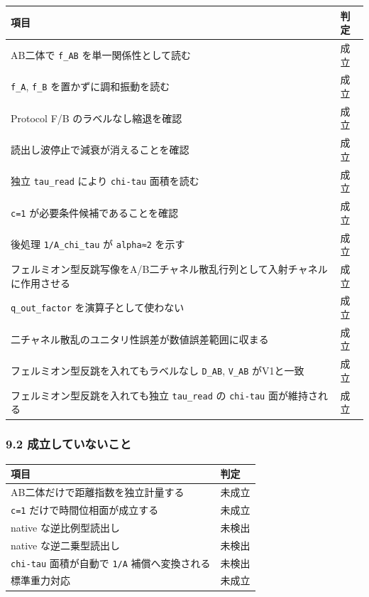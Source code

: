 \documentclass[
]{article}
\newcounter{none} %
\begin{document}
{\def\LTcaptype{none} %
\begin{longtable}[]{@{}
  >{\raggedright\arraybackslash}p{}
  >{\raggedright\arraybackslash}p{}@{}}
\toprule\noalign{}
\begin{minipage}[b]{\linewidth}\raggedright
項目
\end{minipage} & \begin{minipage}[b]{\linewidth}\raggedright
判定
\end{minipage} \\
\midrule\noalign{}
\endhead
\bottomrule\noalign{}
\endlastfoot
AB二体で \texttt{f\_AB} を単一関係性として読む & 成立 \\
\texttt{f\_A}, \texttt{f\_B} を置かずに調和振動を読む & 成立 \\
Protocol F/B のラベルなし縮退を確認 & 成立 \\
読出し波停止で減衰が消えることを確認 & 成立 \\
独立 \texttt{tau\_read} により \texttt{chi-tau} 面積を読む & 成立 \\
\texttt{c=1} が必要条件候補であることを確認 & 成立 \\
後処理 \texttt{1/A\_chi\_tau} が \texttt{alpha≈2} を示す & 成立 \\
フェルミオン型反跳写像をA/B二チャネル散乱行列として入射チャネルに作用させる
& 成立 \\
\texttt{q\_out\_factor} を演算子として使わない & 成立 \\
二チャネル散乱のユニタリ性誤差が数値誤差範囲に収まる & 成立 \\
フェルミオン型反跳を入れてもラベルなし \texttt{D\_AB}, \texttt{V\_AB}
がV1と一致 & 成立 \\
フェルミオン型反跳を入れても独立 \texttt{tau\_read} の \texttt{chi-tau}
面が維持される & 成立 \\
\end{longtable}
}

\subsubsection{9.2
成立していないこと}\label{ux6210ux7acbux3057ux3066ux3044ux306aux3044ux3053ux3068}

{\def\LTcaptype{none} %
\begin{longtable}[]{@{}ll@{}}
\toprule\noalign{}
項目 & 判定 \\
\midrule\noalign{}
\endhead
\bottomrule\noalign{}
\endlastfoot
AB二体だけで距離指数を独立計量する & 未成立 \\
\texttt{c=1} だけで時間位相面が成立する & 未成立 \\
native な逆比例型読出し & 未検出 \\
native な逆二乗型読出し & 未検出 \\
\texttt{chi-tau} 面積が自動で \texttt{1/A} 補償へ変換される & 未検出 \\
標準重力対応 & 未成立 \\
\end{longtable}
}
\end{document}
